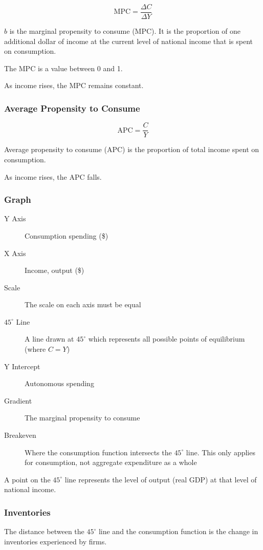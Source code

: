 \documentclass[a4paper,11pt]{report}
\begin{document}
$$
\mbox{MPC} = \frac{\Delta C}{\Delta Y}
$$

$b$ is the marginal propensity to consume (MPC). It is the proportion of one
additional dollar of income at the current level of national income that is
spent on consumption.

The MPC is a value between 0 and 1.

As income rises, the MPC remains constant.

\subsubsection{Average Propensity to Consume}

$$
\mbox{APC} = \frac{C}{Y}
$$

Average propensity to consume (APC) is the proportion of total income spent on
consumption.

As income rises, the APC falls.

\subsubsection{Graph}


\begin{description}
\item [Y Axis] Consumption spending (\$)
\item [X Axis] Income, output (\$)
\item [Scale] The scale on each axis must be equal
\item [$45^\circ$ Line] A line drawn at $45^\circ$ which represents all possible
	points of equilibrium (where $C = Y$)
\item [Y Intercept] Autonomous spending
\item [Gradient] The marginal propensity to consume
\item [Breakeven] Where the consumption function intersects the $45^\circ$ line.
	This only applies for consumption, not aggregate expenditure as a whole
\end{description}

A point on the $45^\circ$ line represents the level of output (real GDP) at
that level of national income.

\subsubsection{Inventories}

The distance between the $45^\circ$ line and the consumption function is the
change in inventories experienced by firms.
\end{document}
